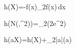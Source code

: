 h(X)=-\int f(x)\log_2f(x)\,dx

h(\mathcal N(\mu,\sigma^2))=\log_2(2\pi e\sigma^2)

h(aX)=h(X)+\log_2|a|\quad(a)
